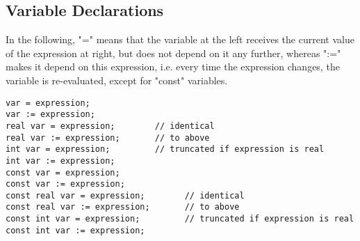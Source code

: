 
\subsection{Variable Declarations}

In the following, "=" means that the variable at the left receives the
current value of the expression at right, but does not depend on it any
further, whereas ":=" makes it depend on this expression, i.e. every
time the expression changes, the variable is re-evaluated, except for
"const" variables.  

\begin{verbatim}
var = expression;
var := expression;
real var = expression;        // identical
real var := expression;       // to above
int var = expression;         // truncated if expression is real
int var := expression;
const var = expression;
const var := expression;
const real var = expression;        // identical
const real var := expression;       // to above
const int var = expression;         // truncated if expression is real
const int var := expression;
\end{verbatim}


